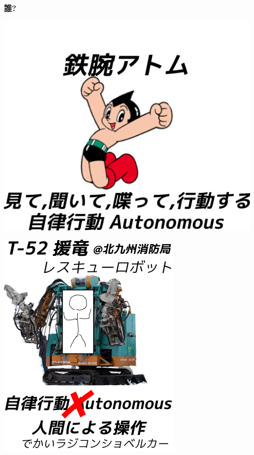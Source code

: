 \subsubsection{誰?}
\label{sec:orgheadline5}

\begin{container-fluid}
\begin{row-fluid}
\begin{span6}
\includegraphics{img/astro/final.png}
\end{span6}
\begin{span6}
\includegraphics{img/rescue/final.png}
\end{span6}
\end{row-fluid}
\begin{row-fluid}
\begin{span12}
\begin{xlarge}
　
\end{xlarge}
\end{span12}
\end{row-fluid}
\end{container-fluid}

